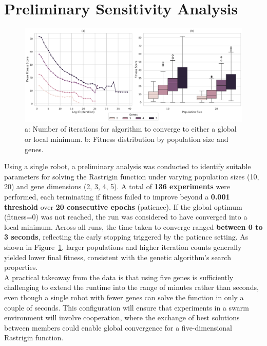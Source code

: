 \documentclass[conference]{IEEEtran}
\begin{document}
\newpage
\section{Preliminary Sensitivity Analysis}

\begin{figure}[h]
    \centering
    \includegraphics[width=1\textwidth]{ga_prelim_analysis.pdf}
    \caption{a: Number of iterations for algorithm to converge to either a global or local minimum. b: Fitness distribution by population size and genes.}
    \label{fig:ga_prelim_analysis}
\end{figure}

Using a single robot, a preliminary analysis was conducted to identify suitable parameters for solving the Rastrigin function under varying population sizes (10, 20) and gene dimensions (2, 3, 4, 5). A total of \textbf{136 experiments} were performed, each terminating if fitness failed to improve beyond a \textbf{0.001 threshold} over \textbf{20 consecutive epochs} (patience). %
If the global optimum (fitness=0) was not reached, the run was considered to have converged into a local minimum. Across all runs, the time taken to converge ranged \textbf{between 0 to 3 seconds}, reflecting the early stopping triggered by the patience setting. As shown in Figure~\ref{fig:ga_prelim_analysis}, larger populations and higher iteration counts generally yielded lower final fitness, consistent with the genetic algorithm’s search properties.\\

A practical takeaway from the data is that using five genes is sufficiently challenging to extend the runtime into the range of minutes rather than seconds, even though a single robot with fewer genes can solve the function in only a couple of seconds. This configuration will ensure that experiments in a swarm environment will involve cooperation, where the exchange of best solutions between members could enable global convergence for a five-dimensional Rastrigin function.
\end{document}
